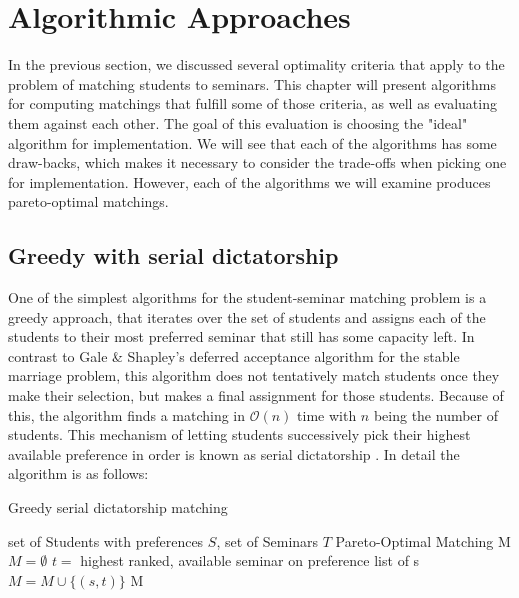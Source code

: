 \section{Algorithmic Approaches}\label{chapter:algorithms}
In the previous section, we discussed several optimality criteria that apply to the problem of matching students to seminars. This chapter will present algorithms for computing matchings that fulfill some of those criteria, as well as evaluating them against each other. The goal of this evaluation is choosing the "ideal" algorithm for implementation. We will see that each of the algorithms has some draw-backs, which makes it necessary to consider the trade-offs when picking one for implementation. However, each of the algorithms we will examine produces pareto-optimal matchings. 

\subsection{Greedy with serial dictatorship}\label{algo-rsd}
One of the simplest algorithms for the student-seminar matching problem is a greedy approach, that iterates over the set of students and assigns each of the students to their most preferred seminar that still has some capacity left. In contrast to Gale \& Shapley's deferred acceptance algorithm for the stable marriage problem, this algorithm does not tentatively match students once they make their selection, but makes a final assignment for those students. Because of this, the algorithm finds a matching in $\mathcal{O}(n)$ time with $n$ being the number of students. This mechanism of letting students successively pick their highest available preference in order is known as serial dictatorship \cite{MANEA2007316}. In detail the algorithm is as follows: 

\begin{algorithm} %
    \caption{Greedy serial dictatorship matching} 
    \label{alg1} %
    \begin{algorithmic} %
        \Require set of Students with preferences $S$, set of Seminars $T$
        \Ensure Pareto-Optimal Matching M
        \State $M = \emptyset$
            \State $t =$ highest ranked, available seminar on preference list of s
                \State $M = M \cup \{(s, t)\}$
            \EndIf
        \EndFor
        \State\Return M
        \EndFunction
    \end{algorithmic}
\end{algorithm}


